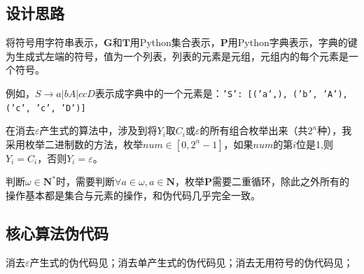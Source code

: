 \documentclass[lang=cn,11pt,a4paper,cite=authornum]{paper}
\begin{document}
\subsection{设计思路}

将符号用字符串表示，$\mathbf G$和$\mathbf T$用Python集合表示，$\mathbf P$用Python字典表示，字典的键为生成式左端的符号，值为一个列表，列表的元素是元组，元组内的每个元素是一个符号。

例如，$S\rightarrow a|bA|ccD$表示成字典中的一个元素是：\texttt{{'S': [('a',), ('b', 'A'), ('c', 'c', 'D')]}}

在消去$\varepsilon$产生式的算法中，涉及到将$Y_i$取$C_i$或$\varepsilon$的所有组合枚举出来（共$2^n$种），我采用枚举二进制数的方法，枚举$num\in[0,2^n-1]$，如果$num$的第$i$位是1,则$Y_i=C_i$，否则$Y_i=\varepsilon$。

判断$\omega\in \mathbf N^*$时，需要判断$\forall a\in\omega, a\in\mathbf N$，枚举$\mathbf P$需要二重循环，除此之外所有的操作基本都是集合与元素的操作，和伪代码几乎完全一致。

\subsection{核心算法伪代码}

消去$\varepsilon$产生式的伪代码见；消去单产生式的伪代码见；消去无用符号的伪代码见；
\end{document}
